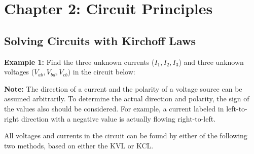 \usepackage{html}
\textwidth 6.0in
\topmargin -0.5in
\oddsidemargin -0in
\evensidemargin -0.5in


\section*{Chapter 2: Circuit Principles}

\subsection*{Solving Circuits with Kirchoff Laws}

{\bf Example 1:} Find the three unknown currents ($I_1,I_2,I_3$) and three 
	unknown voltages ($V_{ab}, V_{bd}, V_{cb}$) in the circuit below:


{\bf Note:} The direction of a current and the polarity of a voltage source 
can be assumed arbitrarily. To determine the actual direction and polarity, 
the sign of the values also should be considered. For example, a current 
labeled in left-to-right direction with a negative value is actually flowing 
right-to-left.

All voltages and currents in the circuit can be found by either of the 
following two methods, based on either the KVL or KCL.

